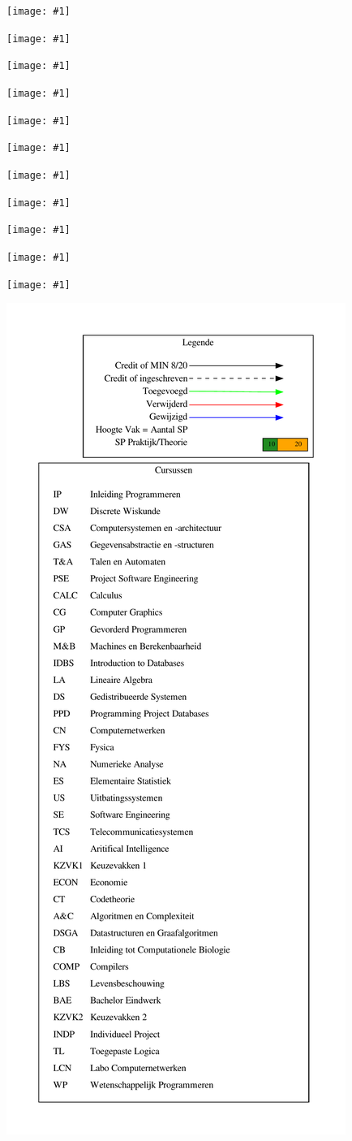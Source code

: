 \documentclass[a4paper]{article}
\newcommand*{\includeFullPage}[1]{ %
    \newpage%
    \vspace*{-2.5cm}%
    \hspace*{-0.16\textwidth}%
    \texttt{[image: \#1]}%
}
\begin{document}
        \includeFullPage{Overview/COMP_solution_rel.pdf}

        \includeFullPage{Overview/LBS_solution_rel.pdf}

        \includeFullPage{Overview/BAE_solution_rel.pdf}

        \includeFullPage{Overview/WP_solution_rel.pdf}

        \includeFullPage{Overview/ECON_solution_rel.pdf}

        \includeFullPage{Overview/CT_solution_rel.pdf}

        \includeFullPage{Overview/CB_solution_rel.pdf}

        \includeFullPage{Overview/INDP_solution_rel.pdf}

        \includeFullPage{Overview/TL_solution_rel.pdf}

        \includeFullPage{Overview/LCN_solution_rel.pdf}


    \includeFullPage{solution_abs.pdf}

    \newpage
    \recalctypearea

    \newpage
    \vspace*{-3.5cm}
    \includegraphics[height=1.5\textheight]{legend.pdf}
\end{document}

